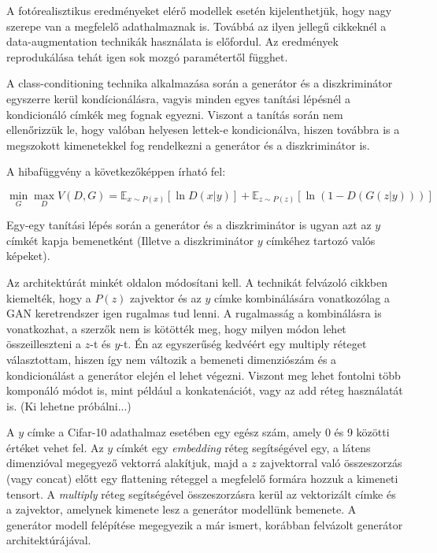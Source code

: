 A fotórealisztikus eredményeket elérő modellek esetén kijelenthetjük, hogy nagy szerepe van a megfelelő adathalmaznak is. Továbbá az ilyen jellegű cikkeknél a data-augmentation technikák használata is előfordul. Az eredmények reprodukálása tehát igen sok mozgó paramétertől függhet.

A class-conditioning technika alkalmazása során a generátor és a diszkriminátor egyszerre kerül kondícionálásra, vagyis minden egyes tanítási lépésnél a kondicionáló címkék meg fognak egyezni. Viszont a tanítás során nem ellenőrizzük le, hogy valóban helyesen lettek-e kondicionálva, hiszen továbbra is a megszokott kimenetekkel fog rendelkezni a generátor és a diszkriminátor is.

A hibafüggvény a következőképpen írható fel:

$$\min_{G}\max_{D}V(D, G) =  \mathbb{E}_{x \sim P(x)} \left[\ln D(x|y) \right] + \mathbb{E}_{z \sim P(z)} \left[\ln(1 - D(G(z|y))) \right]$$

Egy-egy tanítási lépés során a generátor és a diszkriminátor is ugyan azt az $y$ címkét kapja bemenetként (Illetve a diszkriminátor $y$ címkéhez tartozó valós képeket).

Az architektúrát minkét oldalon módosítani kell. A technikát felvázoló cikkben \cite{mirza2014conditional} kiemelték, hogy a $P(z)$ zajvektor és az $y$ címke kombinálására vonatkozólag a GAN keretrendszer igen rugalmas tud lenni. A rugalmasság a kombinálásra is vonatkozhat, a szerzők nem is kötötték meg, hogy milyen módon lehet összeilleszteni a $z$-t és $y$-t. Én az egyszerűség kedvéért egy multiply réteget választottam, hiszen így nem változik a bemeneti dimenziószám és a kondicionálást a generátor elején el lehet végezni. Viszont meg lehet fontolni több komponáló módot is, mint például a konkatenációt, vagy az add réteg használatát is. (Ki lehetne próbálni...)

A $y$ címke a Cifar-10 adathalmaz esetében egy egész szám, amely 0 és 9 közötti értéket vehet fel. Az $y$ címkét egy \textit{embedding} réteg segítségével egy, a látens dimenzióval megegyező vektorrá alakítjuk, majd a $z$ zajvektorral való összeszorzás (vagy concat) előtt egy flattening réteggel a megfelelő formára hozzuk a kimeneti tensort.
A \textit{multiply} réteg segítségével összeszorzásra kerül az vektorizált címke és a zajvektor, amelynek kimenete lesz a generátor modellünk bemenete. A generátor modell felépítése megegyezik a már ismert, korábban felvázolt generátor architektúrájával. 

